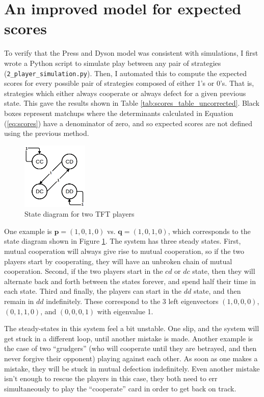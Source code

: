 \documentclass{article}
\renewcommand{\vec}[1]{\mathbf{#1}}
\begin{document}
\section{An improved model for expected scores}
To verify that the Press and Dyson model was consistent with simulations, I first wrote a Python script to simulate play between any pair of strategies (\texttt{2\_player\_simulation.py}). Then, I automated this to compute the expected scores for every possible pair of strategies composed of either 1's or 0's. That is, strategies which either always cooperate or always defect for a given previous state. This gave the results shown in Table \ref{tab:scores_table_uncorrected}. Black boxes represent matchups where the determinants calculated in Equation (\ref{eq:scores}) have a denominator of zero, and so expected scores are not defined using the previous method.
\begin{figure}
\begin{center}\includegraphics[width=0.28\textwidth]{state_diagram.png}
\end{center}\caption{State diagram for two TFT players} \label{fig:tft_markov}
\end{figure}
One example is \(\vec{p} = (1, 0, 1, 0)\) vs. \(\vec{q} = (1, 0, 1, 0)\), which corresponds to the state diagram shown in Figure \ref{fig:tft_markov}. The system has three steady states. First, mutual cooperation will always give rise to mutual cooperation, so if the two players start by cooperating, they will have an unbroken chain of mutual cooperation.
Second, if the two players start in the \(cd\) or \(dc\) state, then they will alternate back and forth between the states forever, and spend half their time in each state. Third and finally, the players can start in the \(dd\) state, and then remain in \(dd\) indefinitely. These correspond to the 3 left eigenvectors \((1, 0, 0, 0)\), \((0, 1, 1, 0)\), and \((0, 0, 0, 1)\) with eigenvalue 1.

The steady-states in this system feel a bit unstable. One slip, and the system will get stuck in a different loop, until another mistake is made. Another example is the case of two ``grudgers'' (who will cooperate until they are betrayed, and then never forgive their opponent) playing against each other. As soon as one makes a mistake, they will be stuck in mutual defection indefinitely. Even another mistake isn't enough to rescue the players in this case, they both need to err simultaneously to play the ``cooperate'' card in order to get back on track.
\end{document}
